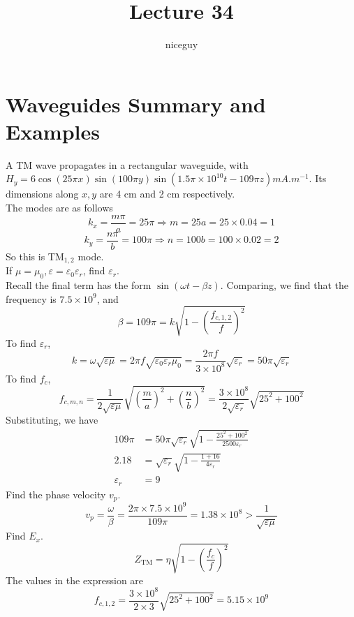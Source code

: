 \documentclass[12pt]{article}
\title{Lecture 34}
\author{niceguy}
\begin{document}
\maketitle

\section{Waveguides Summary and Examples}

\begin{ex}
    A TM wave propagates in a rectangular waveguide, with $H_y = 6\cos(25\pi x)\sin(100\pi y)\sin(1.5\pi \times 10^{10}t - 109\pi z)\unit{mA.m^{-1}}$. Its dimensions along $x, y$ are 4 cm and 2 cm respectively. \\
    The modes are as follows
    $$k_x = \frac{m\pi}{a} = 25\pi \Rightarrow m = 25a = 25 \times 0.04 = 1$$
    $$k_y = \frac{n\pi}{b} = 100\pi \Rightarrow n = 100b = 100 \times 0.02 = 2$$
    So this is TM$_{1,2}$ mode. \\
    If $\mu = \mu_0, \varepsilon = \varepsilon_0\varepsilon_r$, find $\varepsilon_r$. \\
    Recall the final term has the form $\sin(\omega t - \beta z)$. Comparing, we find that the frequency is $7.5 \times 10^9$, and
    $$\beta = 109\pi = k\sqrt{1 - \left(\frac{f_{c,1,2}}{f}\right)^2}$$
    To find $\varepsilon_r$,
    $$k = \omega\sqrt{\varepsilon\mu} = 2\pi f\sqrt{\varepsilon_0\varepsilon_r\mu_0} = \frac{2\pi f}{3 \times 10^8}\sqrt{\varepsilon_r} = 50\pi\sqrt{\varepsilon_r}$$
    To find $f_c$,
    $$f_{c,m,n} = \frac{1}{2\sqrt{\varepsilon\mu}} \sqrt{\left(\frac{m}{a}\right)^2 + \left(\frac{n}{b}\right)^2} = \frac{3\times10^8}{2\sqrt{\varepsilon_r}} \sqrt{25^2 + 100^2}$$
    Substituting, we have
    \begin{align*}
        109\pi &= 50\pi\sqrt{\varepsilon_r}\sqrt{1 - \frac{25^2+100^2}{2500\varepsilon_r}} \\
        2.18 &= \sqrt{\varepsilon_r}\sqrt{1 - \frac{1 + 16}{4\varepsilon_r}} \\
        \varepsilon_r &= 9
    \end{align*}
    Find the phase velocity $v_p$. \\
    $$v_p = \frac{\omega}{\beta} = \frac{2\pi \times 7.5 \times 10^9}{109\pi} = 1.38 \times 10^8 > \frac{1}{\sqrt{\varepsilon\mu}}$$
    Find $E_x$. \\
    $$Z_{\text{TM}} = \eta\sqrt{1 - \left(\frac{f_c}{f}\right)^2}$$
    The values in the expression are
    $$f_{c,1,2} = \frac{3\times10^8}{2\times3}\sqrt{25^2 + 100^2} = 5.15 \times 10^9$$

\end{ex}
\end{document}
